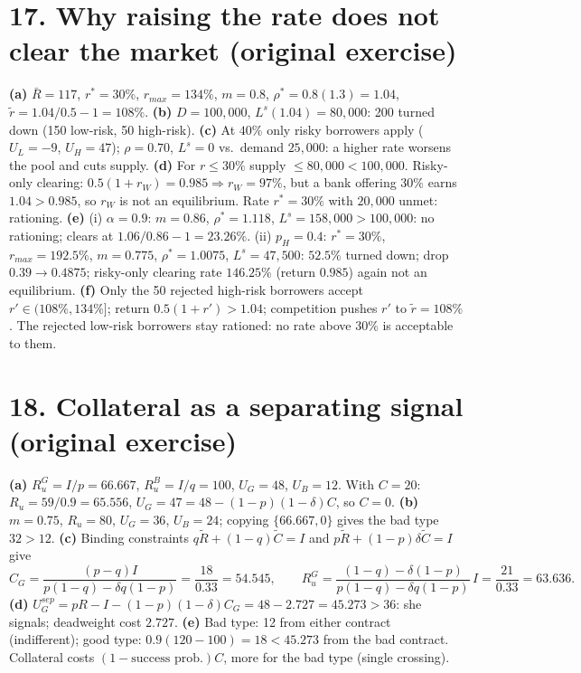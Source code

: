 \documentclass[11pt,a4paper]{article}
\begin{document}
\section*{17. Why raising the rate does not clear the market (original exercise)}

\textbf{(a)} $\bar R=117$, $r^*=30\%$, $r_{max}=134\%$, $m=0.8$, $\rho^*=0.8(1.3)=1.04$, $\tilde r=1.04/0.5-1=108\%$.
\textbf{(b)} $D=100{,}000$, $L^s(1.04)=80{,}000$: 200 turned down (150 low-risk, 50 high-risk).
\textbf{(c)} At $40\%$ only risky borrowers apply ($U_L=-9$, $U_H=47$); $\rho=0.70$, $L^s=0$ vs.\ demand $25{,}000$: a higher rate worsens the pool and cuts supply.
\textbf{(d)} For $r\le30\%$ supply $\le80{,}000<100{,}000$. Risky-only clearing: $0.5(1+r_W)=0.985\Rightarrow r_W=97\%$, but a bank
offering $30\%$ earns $1.04>0.985$, so $r_W$ is not an equilibrium. Rate $r^*=30\%$ with $20{,}000$ unmet: rationing.
\textbf{(e)} (i) $\alpha=0.9$: $m=0.86$, $\rho^*=1.118$, $L^s=158{,}000>100{,}000$: no rationing; clears at $1.06/0.86-1=23.26\%$.
(ii) $p_H=0.4$: $r^*=30\%$, $r_{max}=192.5\%$, $m=0.775$, $\rho^*=1.0075$, $L^s=47{,}500$: $52.5\%$ turned down; drop
$0.39\to0.4875$; risky-only clearing rate $146.25\%$ (return $0.985$) again not an equilibrium.
\textbf{(f)} Only the 50 rejected high-risk borrowers accept $r'\in(108\%,134\%]$; return $0.5(1+r')>1.04$; competition pushes
$r'$ to $\tilde r=108\%$. The rejected low-risk borrowers stay rationed: no rate above $30\%$ is acceptable to them.

\section*{18. Collateral as a separating signal (original exercise)}

\textbf{(a)} $R_u^G=I/p=66.667$, $R_u^B=I/q=100$, $U_G=48$, $U_B=12$. With $C=20$: $R_u=59/0.9=65.556$, $U_G=47=48-(1-p)(1-\delta)C$, so $C=0$.
\textbf{(b)} $m=0.75$, $R_u=80$, $U_G=36$, $U_B=24$; copying $\{66.667,0\}$ gives the bad type $32>12$.
\textbf{(c)} Binding constraints $q\tilde R+(1-q)\tilde C=I$ and $p\tilde R+(1-p)\delta\tilde C=I$ give
$$C_G=\frac{(p-q)I}{p(1-q)-\delta q(1-p)}=\frac{18}{0.33}=54.545,\qquad R_u^G=\frac{(1-q)-\delta(1-p)}{p(1-q)-\delta q(1-p)}\,I=\frac{21}{0.33}=63.636.$$
\textbf{(d)} $U_G^{sep}=pR-I-(1-p)(1-\delta)C_G=48-2.727=45.273>36$: she signals; deadweight cost $2.727$.
\textbf{(e)} Bad type: 12 from either contract (indifferent); good type: $0.9(120-100)=18<45.273$ from the bad contract. Collateral
costs $(1-\text{success prob.})C$, more for the bad type (single crossing).
\end{document}
